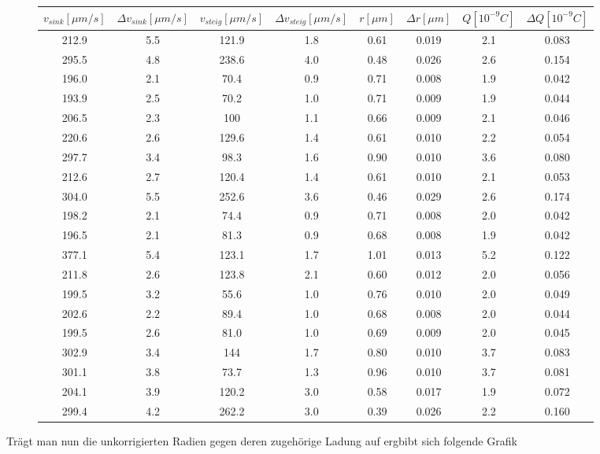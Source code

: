 \documentclass{scrartcl}
\begin{document}
	\begin{figure}[H]
		\begin{tabular}{c|c|c|c|c|c|c|c}
			\hline
			$v_{sink} [\mu m/s]$ & $\Delta v_{sink} [\mu m/s]$ & $v_{steig} [\mu m/s]$ &$\Delta v_{steig} [\mu m/s]$ & $r [\mu m] $&$ \Delta r [\mu m]$ &$ Q [10^{-9} C] $&$ \Delta Q [10^{-9} C]$\\
			\hline
			212.9 & 5.5 & 121.9 & 1.8 & 0.61 & 0.019 & 2.1 & 0.083\\
			295.5 & 4.8 & 238.6 & 4.0 & 0.48 & 0.026 & 2.6 & 0.154\\
			196.0 & 2.1 & 70.4 & 0.9 & 0.71 & 0.008 & 1.9 & 0.042\\
			193.9 & 2.5 & 70.2 & 1.0 & 0.71 & 0.009 & 1.9 & 0.044\\
			206.5 & 2.3 & 100 & 1.1 & 0.66 & 0.009 & 2.1 & 0.046\\
			220.6 & 2.6 & 129.6 & 1.4 & 0.61 & 0.010 & 2.2 & 0.054\\
			297.7 & 3.4 & 98.3 & 1.6 & 0.90 & 0.010 & 3.6 & 0.080\\
			212.6 & 2.7 & 120.4 & 1.4 & 0.61 & 0.010 & 2.1 & 0.053\\
			304.0 & 5.5 & 252.6 & 3.6 & 0.46 & 0.029 & 2.6 & 0.174\\
			198.2 & 2.1 & 74.4 & 0.9 & 0.71 & 0.008 & 2.0 & 0.042\\
			196.5 & 2.1 & 81.3 & 0.9 & 0.68 & 0.008 & 1.9 & 0.042\\
			377.1 & 5.4 & 123.1 & 1.7 & 1.01 & 0.013 & 5.2 & 0.122\\
			211.8 & 2.6 & 123.8 & 2.1 & 0.60 & 0.012 & 2.0 & 0.056\\
			199.5 & 3.2 & 55.6 & 1.0 & 0.76 & 0.010 & 2.0 & 0.049\\
			202.6 & 2.2 & 89.4 & 1.0 & 0.68 & 0.008 & 2.0 & 0.044\\
			199.5 & 2.6 & 81.0 & 1.0 & 0.69 & 0.009 & 2.0 & 0.045\\
			302.9 & 3.4 & 144 & 1.7 & 0.80 & 0.010 & 3.7 & 0.083\\
			301.1 & 3.8 & 73.7 & 1.3 & 0.96 & 0.010 & 3.7 & 0.081\\
			204.1 & 3.9 & 120.2 & 3.0 & 0.58 & 0.017 & 1.9 & 0.072\\
			299.4 & 4.2 & 262.2 & 3.0 & 0.39 & 0.026 & 2.2 & 0.160\\
		\end{tabular}
	\end{figure}
	Trägt man nun die unkorrigierten Radien gegen deren zugehörige Ladung auf ergbibt sich folgende Grafik
\end{document}
